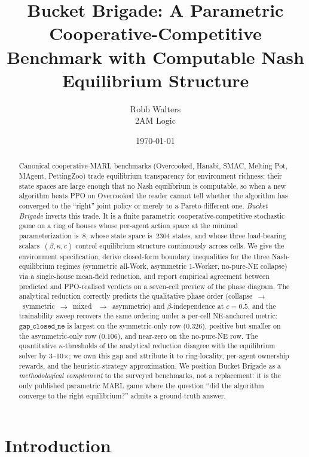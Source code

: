\documentclass{anvil-paper}
\title{Bucket Brigade: A Parametric Cooperative-Competitive Benchmark with
Computable Nash Equilibrium Structure}
\author{Robb Walters \\ 2AM Logic}
\date{\today}
\begin{document}
\maketitle

\begin{abstract}
Canonical cooperative-MARL benchmarks (Overcooked, Hanabi, SMAC, Melting Pot,
MAgent, PettingZoo) trade equilibrium transparency for environment richness:
their state spaces are large enough that no Nash equilibrium is computable, so
when a new algorithm beats PPO on Overcooked the reader cannot tell whether
the algorithm has converged to the ``right'' joint policy or merely to a
Pareto-different one. \emph{Bucket Brigade} inverts this trade. It is a finite
parametric cooperative-competitive stochastic game on a ring of houses whose
per-agent action space at the minimal parameterization is~$8$, whose state
space is~$2304$ states, and whose three load-bearing scalars~$(\beta,\kappa,c)$
control equilibrium structure continuously across cells. We give the
environment specification, derive closed-form boundary inequalities for the
three Nash-equilibrium regimes (symmetric all-Work, asymmetric 1-Worker,
no-pure-NE collapse) via a single-house mean-field reduction, and report
empirical agreement between predicted and PPO-realised verdicts on a
seven-cell preview of the phase diagram. The analytical reduction correctly
predicts the qualitative phase order (collapse~$\to$~symmetric~$\to$~mixed
~$\to$~asymmetric) and $\beta$-independence at $c{=}0.5$, and the
trainability sweep recovers the same ordering under a per-cell NE-anchored
metric: $\texttt{gap\_closed\_ne}$ is largest on the symmetric-only row
($0.326$), positive but smaller on the asymmetric-only row ($0.106$), and
near-zero on the no-pure-NE row. The quantitative $\kappa$-thresholds of the
analytical reduction disagree with the equilibrium solver by 3--10$\times$;
we own this gap and attribute it to ring-locality, per-agent ownership
rewards, and the heuristic-strategy approximation. We position Bucket
Brigade as a \emph{methodological complement} to the surveyed benchmarks,
not a replacement: it is the only published parametric MARL game where the
question ``did the algorithm converge to the right equilibrium?'' admits a
ground-truth answer.
\end{abstract}

\section{Introduction}
\label{sec:intro}
\end{document}
